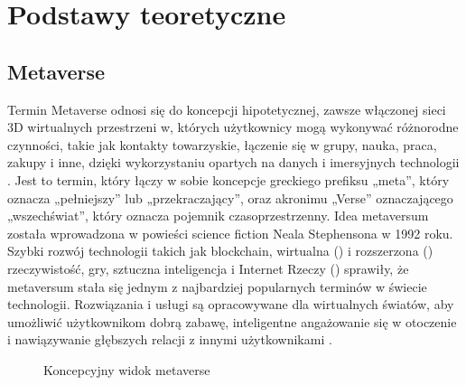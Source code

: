 
\chapter{Podstawy teoretyczne}
\section{Metaverse}


Termin Metaverse odnosi się do koncepcji hipotetycznej, zawsze włączonej sieci 3D wirtualnych przestrzeni w, których użytkownicy mogą wykonywać różnorodne czynności, takie jak kontakty towarzyskie, łączenie się w grupy, nauka, praca, zakupy i inne, dzięki wykorzystaniu opartych na danych i imersyjnych technologii \cite{smartcities5030043}\cite{metaverseDefinitionReview}. Jest to termin, który łączy w sobie koncepcje greckiego prefiksu „meta”, który oznacza „pełniejszy” lub „przekraczający”, oraz akronimu „Verse” oznaczającego „wszechświat”, który oznacza pojemnik czasoprzestrzenny. Idea metaversum została wprowadzona w powieści science fiction Neala Stephensona  w 1992 roku. Szybki rozwój technologii takich jak blockchain, wirtualna () i rozszerzona () rzeczywistość, gry, sztuczna inteligencja i Internet Rzeczy  () sprawiły, że metaversum stała się jednym z najbardziej popularnych terminów w świecie technologii. Rozwiązania i usługi są opracowywane dla wirtualnych światów, aby umożliwić użytkownikom dobrą zabawę, inteligentne angażowanie się w otoczenie i nawiązywanie głębszych relacji z innymi użytkownikami \cite{metaverseAsAService}. 

\begin{figure}[htbp!]
    \centering
    
    \caption{Koncepcyjny widok metaverse\cite{metaverseUseCaseslee}}
    \label{fig:enter-label}
\end{figure}

